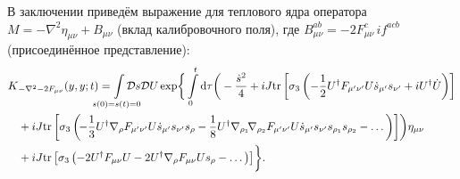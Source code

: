 В заключении приведём выражение для теплового ядра оператора $M=-\nabla^2\eta_{\mu \nu}+B_{\mu \nu}$ (вклад калибровочного поля), где $B^{ab}_{\mu \nu}=-2F^c_{\mu \nu}\,if^{acb}$ (присоединённое представление):
\begin{equation}
	\label{eq:intFullGauge}
	\begin{split}
K&_{-\nabla^2-2F_{\mu \nu}}(y,y;t)=\mkern-6\thickmuskip \int\limits_{s(0)=s(t)=0}\mkern-6\thickmuskip \mathcal{D}s\mathcal{D}U \exp\biggr\{
		\int\limits_0^t \D \tau \biggr(-\frac{\dot{s}^2}{4}+ iJ\tr\left[\sigma_3\left( -\frac12 U^\dagger F_{\mu'\nu'}U \dot{s}_{\mu'} s_{\nu'} + iU^\dagger \dot{U}\right)\right]\\
				&+ iJ\tr\left[ \sigma_3\left(\!-\frac13 U^\dagger \nabla_\rho F_{\mu' \nu'}U\dot{s}_{\mu'} s_{\nu'} s_\rho -\frac18 U^\dagger\nabla_{\rho_1}\!\nabla_{\rho_2}F_{\mu' \nu'}U\dot{s}_{\mu'} s_{\nu'} s_{\rho_1} s_{\rho_2} - \dots \right) \right]\biggr)\eta_{\mu \nu}\\
				&+ iJ\tr\left[ \sigma_3\left( - 2U^\dagger F_{\mu \nu}U - 2U^\dagger\nabla_{\rho}F_{\mu \nu}Us_{\rho}-\dots \right) \right]
		\biggr\}.
	\end{split}
\end{equation}